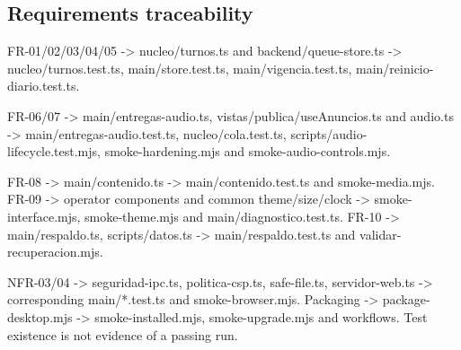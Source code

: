 \subsection{Requirements traceability}

FR-01/02/03/04/05 -> nucleo/turnos.ts and backend/queue-store.ts -> nucleo/turnos.test.ts, main/store.test.ts, main/vigencia.test.ts, main/reinicio-diario.test.ts.

FR-06/07 -> main/entregas-audio.ts, vistas/publica/useAnuncios.ts and audio.ts -> main/entregas-audio.test.ts, nucleo/cola.test.ts, scripts/audio-lifecycle.test.mjs, smoke-hardening.mjs and smoke-audio-controls.mjs.

FR-08 -> main/contenido.ts -> main/contenido.test.ts and smoke-media.mjs. FR-09 -> operator components and common theme/size/clock -> smoke-interface.mjs, smoke-theme.mjs and main/diagnostico.test.ts. FR-10 -> main/respaldo.ts, scripts/datos.ts -> main/respaldo.test.ts and validar-recuperacion.mjs.

NFR-03/04 -> seguridad-ipc.ts, politica-csp.ts, safe-file.ts, servidor-web.ts -> corresponding main/*.test.ts and smoke-browser.mjs. Packaging -> package-desktop.mjs -> smoke-installed.mjs, smoke-upgrade.mjs and workflows. Test existence is not evidence of a passing run.
